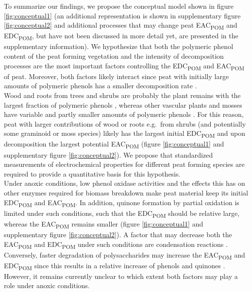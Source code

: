 \documentclass[alpha-refs]{wiley-article-rmd}
\begin{document}
\begin{refsection}
To summarize our findings, we propose the conceptual model shown in figure \ref{fig:conceptual1} (an additional representation is shown in supplementary figure \ref{fig:conceptual2} and additional processes that may change peat EAC\textsubscript{POM} and EDC\textsubscript{POM}, but have not been discussed in more detail yet, are presented in the supplementary information). We hypothesize that both the polymeric phenol content of the peat forming vegetation and the intensity of decomposition processes are the most important factors controlling the EDC\textsubscript{POM} and EAC\textsubscript{POM} of peat. Moreover, both factors likely interact since peat with initially large amounts of polymeric phenols has a smaller decomposition rate \autocite{Bengtsson.2018}.\\
Wood and roots from trees and shrubs are probably the plant remains with the largest fraction of polymeric phenols \autocite{Benner.1984,Williams.1998,Strakova.2010,Hodgkins.2018}, whereas other vascular plants and mosses have variable and partly smaller amounts of polymeric phenols \autocite{Williams.1998,Scheffer.2001,Strakova.2010,Bengtsson.2018,Zak.2019}. For this reason, peat with larger contributions of wood or roots e.g.~from shrubs (and potentially some graminoid or moss species) likely has the largest initial EDC\textsubscript{POM} and upon decomposition the largest potential EAC\textsubscript{POM} (figure \ref{fig:conceptual1} and supplementary figure \ref{fig:conceptual2}). We propose that standardized measurements of electrochemical properties for different peat forming species are required to provide a quantitative basis for this hypothesis.\\
Under anoxic conditions, low phenol oxidase activities and the effects this has on other enzymes required for biomass breakdown \autocite{Fenner.2011} make peat material keep its initial EDC\textsubscript{POM} and EAC\textsubscript{POM}. In addition, quinone formation by partial oxidation is limited under such conditions, such that the EDC\textsubscript{POM} should be relative large, whereas the EAC\textsubscript{POM} remains smaller (figure \ref{fig:conceptual1} and supplementary figure \ref{fig:conceptual2}). A factor that may decrease both the EAC\textsubscript{POM} and EDC\textsubscript{POM} under such conditions are condensation reactions \autocite{Hotta.2002,Uchimiya.2009,Bolton.2018,Zhao.2020,Olk.2006,Heitmann.2006,Yu.2016}. Conversely, faster degradation of polysaccharides may increase the EAC\textsubscript{POM} and EDC\textsubscript{POM} since this results in a relative increase of phenols and quinones \autocite{Benner.1984}. However, it remains currently unclear to which extent both factors may play a role under anoxic conditions.

\end{refsection}
\end{document}
